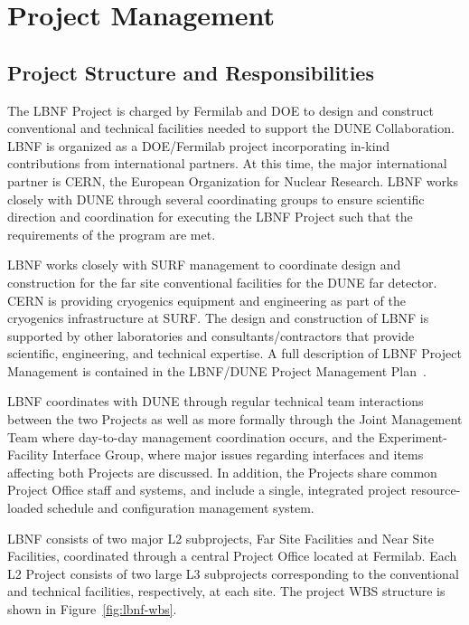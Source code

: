 \chapter{Project Management}
\label{ch:intro-pm}

\section{Project Structure and Responsibilities}

The LBNF Project is charged by Fermilab and DOE to design and construct conventional and technical facilities needed to support the DUNE Collaboration. LBNF is organized as a DOE/Fermilab project incorporating in-kind contributions from international partners. At this time, the major international partner is CERN, the European Organization for Nuclear Research. LBNF works closely with DUNE through several coordinating groups to ensure scientific direction and coordination for executing the LBNF Project such that the requirements of the program are met. 

LBNF works closely with SURF management to coordinate design and construction for the far site conventional facilities for the DUNE far detector. CERN is providing cryogenics equipment and engineering as part of the cryogenics infrastructure at SURF. The design and construction of LBNF is supported by other laboratories and consultants/contractors that provide scientific, engineering, and technical expertise.  A full description of LBNF Project Management is contained in the LBNF/DUNE Project Management Plan~\cite{lbnf-dune-pmp}.

LBNF coordinates with DUNE through regular technical team interactions between the two Projects as well as more formally through the Joint Management Team where day-to-day management coordination occurs, and the Experiment-Facility Interface Group, where major issues regarding interfaces and items affecting both Projects are discussed. In addition, the Projects share common Project Office staff and systems, and include a single, integrated project resource-loaded schedule and configuration management system. 


LBNF consists of two major L2 subprojects, Far Site Facilities and Near Site Facilities, coordinated through a central Project Office located at Fermilab.  Each L2 Project consists of two large L3 subprojects corresponding to the conventional and technical facilities, respectively, at each site. The project WBS structure %
is shown in Figure~\ref{fig:lbnf-wbs}.


